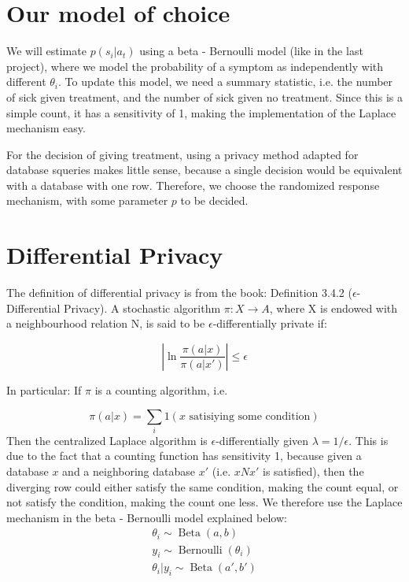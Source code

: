 \documentclass{article}
\begin{document}
\section{Our model of choice}

We will estimate $p(s_i|a_t )$ using a beta - Bernoulli model (like in the last project), 
where we model the probability of a symptom as independently with different $\theta_i$. To update this model, we need a summary statistic, i.e. the number of sick given treatment, and the number of sick given no treatment. Since this is a simple count, it has a sensitivity of 1, making the implementation of the Laplace mechanism easy. 

For the decision of giving treatment, using a privacy method adapted for database 
squeries makes little sense, because a single decision would be equivalent with a database with one row. Therefore, we choose the randomized response mechanism, with some parameter $p$ to be decided. 

\section{Differential Privacy}
The definition of differential privacy is from the book:
Definition 3.4.2 ($\epsilon$-Differential Privacy). A stochastic algorithm $ \pi: X \to A$, where X is
endowed with a neighbourhood relation N, is said to be $\epsilon$-differentially private if:

$$
|\ln \frac{\pi(a|x)}{\pi(a|x')} | \leq \epsilon
$$

In particular: If $\pi$ is a counting algorithm, i.e.

$$
\pi(a|x) = \sum_{i} 1(x \text{ satisiying some condition})
$$
Then the centralized Laplace algorithm is $\epsilon$-differentially given $\lambda =  1/\epsilon$. This is due to the fact that a counting function has sensitivity 1, because given a database $x$ and a neighboring database $x'$ (i.e. $xNx'$ is satisfied), then the diverging row could either satisfy the same condition, making the count equal, or not satisfy the condition, making the count one less.
We therefore use the Laplace mechanism in the beta - Bernoulli model explained below:
\begin{equation}
    \begin{split}
    \theta_i \sim \operatorname{Beta}(a, b)\\
    y_i \sim \operatorname{Bernoulli}(\theta_i)\\
    \theta_i | y_i \sim \operatorname{Beta}(a', b')
\end{split}
\end{equation}
\end{document}
